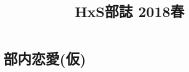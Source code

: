 \documentclass[10.5pt,a4paper]{jsbook}
\title{HxS部誌 2018春}
\date{}
\begin{document}
\maketitle
\tableofcontents

\chapter{部内恋愛(仮)}

\end{document}
